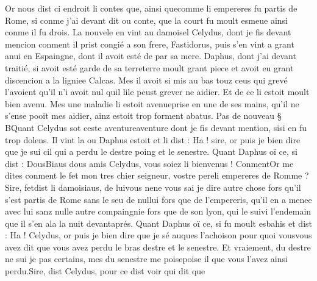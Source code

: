 \documentclass{article}
\begin{document}
\begin{pages}
            
\pstart Or nous dist 
   ci endroit li contes que, ainsi 
   quecomme 
   li empereres fu partis de Rome, 
   si conme j’ai devant dit ou conte, 
   que la court fu moult esmeue ainsi conme il fu drois. 
   La nouvele en vint au damoisel Celydus, dont je fis devant mencion 
   conment il prist congié a son frere, Fastidorus, puis s’en vint a grant anui en 
   Espaingne, dont il avoit esté de par sa mere. 
   Daphus, 
   dont j’ai devant traitié, si avoit esté garde 
   de sa terreterre moult grant piece 
   et avoit eu grant discencion a la ligniee Calcas. Mes il avoit si mis au bas touz ceus qui grevé 
   l’avoient qu’il n’i avoit nul quil lile peust grever ne aidier. 
   Et de ce li estoit moult bien avenu. Mes une maladie li 
   estoit avenueprise en une de ses 
   mains, qu’il ne s’ense pooit mes aidier, 
   ainz estoit trop forment abatus. \pend
\pstart Pas de nouveau § BQuant Celydus 
   sot ceste aventureaventure dont je fis devant mention, 
   sisi en fu trop dolens. 
   Il vint la ou Daphus estoit et li dist :
   Ha ! sire, or puis je bien dire que je sui cil qui a perdu le destre poing et le senestre.
   Quant Daphus oï ce, si dist :
   DousBiaus dous amis 
      Celydus, vous soiez li bienvenus ! 
      ConmentOr me dites conment le fet 
      mon tres chier seigneur, 
         vostre pereli empereres de Romme ?Sire, fetdist 
      li damoisiaus, de luivous 
      nene vous sai je dire autre chose fors 
      qu’il s’est partis de Rome sans le seu de 
      nullui fors que de l’empereris, qu’il en a menee avec lui sanz nulle autre compaingnie fors 
   que de son lyon, qui le suivi l’endemain 
      que il s’en ala la nuit devantaprés. \pend
\pstart Quant Daphus oï ce, si fu moult esbahis et dist :
   Ha ! Celydus, or puis je bien dire 
      que je sé auques l’achoison pour quoi vousvous avez dit que vous 
      avez perdu le bras destre et 
      le senestre. Et vraiement, du destre ne sui je pas certains, mes du senestre 
      me poisepoise il que vous l’avez ainsi perdu.Sire, dist Celydus, pour ce dist voir qui dit que 
   

\end{pages}
\end{document}
